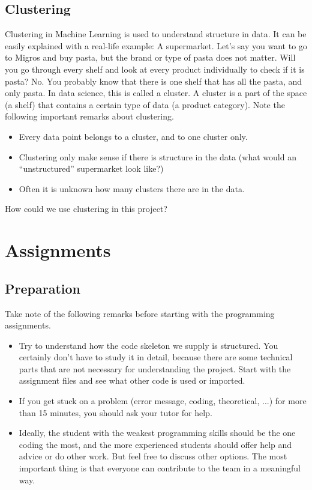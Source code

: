 \documentclass[]{article}
\begin{document}
	\subsection{Clustering}
		Clustering in Machine Learning is used to understand structure in data. 
		It can be easily explained with a real-life example: A supermarket.
		Let's say you want to go to Migros and buy pasta, but the brand or type of pasta does not matter.
		Will you go through every shelf and look at every product individually to check if it is pasta? 
		No. 
		You probably know that there is one shelf that has all the pasta, and only pasta.
		In data science, this is called a cluster.
		A cluster is a part of the space (a shelf) that contains a certain type of data (a product category).
		Note the following important remarks about clustering.
		\begin{itemize}
			\item Every data point belongs to a cluster, and to one cluster only.
			\item Clustering only make sense if there is structure in the data (what would an ``unstructured'' supermarket look like?)
			\item Often it is unknown how many clusters there are in the data.
		\end{itemize}
		How could we use clustering in this project?
		
		

\section{Assignments}

	\subsection{Preparation}
		Take note of the following remarks before starting with the programming assignments.
		\begin{itemize}
			\item Try to understand how the code skeleton we supply is structured.
			You certainly don't have to study it in detail, because there are some technical parts that are not necessary for understanding the project.
			Start with the assignment files and see what other code is used or imported.
			
			\item If you get stuck on a problem (error message, coding, theoretical, ...) for more than 15 minutes, you should ask your tutor for help.
			
			\item Ideally, the student with the weakest programming skills should be the one coding the most, and the more experienced students should offer help and advice or do other work. 
			But feel free to discuss other options. 
			The most important thing is that everyone can contribute to the team in a meaningful way.
		\end{itemize}
\end{document}
